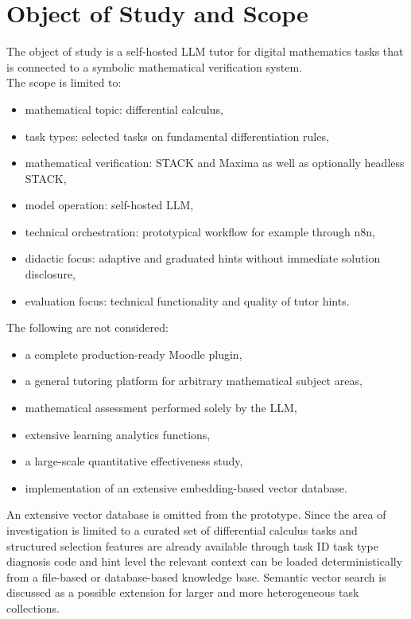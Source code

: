 \documentclass[11pt,a4paper,oneside,ngerman]{memoir}
\begin{document}
\chapter{Object of Study and Scope}
The object of study is a self-hosted LLM tutor for digital mathematics tasks that is connected to a symbolic mathematical verification system.
\hspace{1 cm}\\
The scope is limited to:
\begin{itemize}
    \item mathematical topic: differential calculus,
    \item task types: selected tasks on fundamental differentiation rules,
    \item mathematical verification: STACK and Maxima as well as optionally headless STACK,
    \item model operation: self-hosted LLM,
    \item technical orchestration: prototypical workflow for example through n8n,
    \item didactic focus: adaptive and graduated hints without immediate solution disclosure,
    \item evaluation focus: technical functionality and quality of tutor hints.
\end{itemize}
The following are not considered:
\begin{itemize}
    \item a complete production-ready Moodle plugin,
    \item a general tutoring platform for arbitrary mathematical subject areas,
    \item mathematical assessment performed solely by the LLM,
    \item extensive learning analytics functions,
    \item a large-scale quantitative effectiveness study,
    \item implementation of an extensive embedding-based vector database.
\end{itemize}
An extensive vector database is omitted from the prototype. Since the area of investigation is limited to a curated set of differential calculus tasks and structured selection features are already available through task ID task type diagnosis code and hint level the relevant context can be loaded deterministically from a file-based or database-based knowledge base. Semantic vector search is discussed as a possible extension for larger and more heterogeneous task collections.
\end{document}
